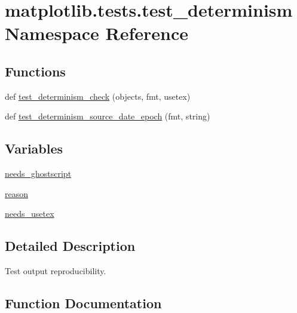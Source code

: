 \hypertarget{namespacematplotlib_1_1tests_1_1test__determinism}{}\section{matplotlib.\+tests.\+test\+\_\+determinism Namespace Reference}
\label{namespacematplotlib_1_1tests_1_1test__determinism}
\subsection*{Functions}
\begin{DoxyCompactItemize}
\item 
def \hyperlink{namespacematplotlib_1_1tests_1_1test__determinism_ad5a271d24a2393fa56bae8e37564a59c}{test\+\_\+determinism\+\_\+check} (objects, fmt, usetex)
\item 
def \hyperlink{namespacematplotlib_1_1tests_1_1test__determinism_a43452efa2aa142d4fc977f9f112ec4ec}{test\+\_\+determinism\+\_\+source\+\_\+date\+\_\+epoch} (fmt, string)
\end{DoxyCompactItemize}
\subsection*{Variables}
\begin{DoxyCompactItemize}
\item 
\hyperlink{namespacematplotlib_1_1tests_1_1test__determinism_ae7992b77be02f452cf0c24621d3b2a52}{needs\+\_\+ghostscript}
\item 
\hyperlink{namespacematplotlib_1_1tests_1_1test__determinism_a06e27c3c2f003a21bb557523f92f9cbc}{reason}
\item 
\hyperlink{namespacematplotlib_1_1tests_1_1test__determinism_a89a7d0d328d9e5108a203402ee1029dc}{needs\+\_\+usetex}
\end{DoxyCompactItemize}


\subsection{Detailed Description}
\begin{DoxyVerb}Test output reproducibility.
\end{DoxyVerb}
 

\subsection{Function Documentation}
\mbox{\label{namespacematplotlib_1_1tests_1_1test__determinism_ad5a271d24a2393fa56bae8e37564a59c}} 
